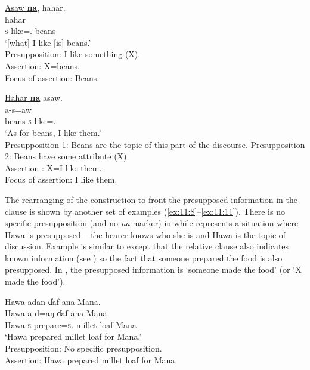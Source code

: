 \ea \label{ex:11:6}
\underline{Asaw  \textbf{na}},  hahar. \\
\gll  {}   hahar\\
      \textsc{s}-like={\oneS}.{\IO} {\PSP}  beans\\
\glt  ‘[what] I like [is] beans.’\\
  Presupposition:     I like something (X). \\
Assertion:     X=beans. \\
Focus of assertion:   Beans.
\z

\ea \label{ex:11:7}
\underline{Hahar  \textbf{na}}  asaw. \\
\gll  {}    a-s=aw\\
      beans  {\PSP} \textsc{s}-like={\oneS}.{\IO}\\
\glt  ‘As for beans, I like them.’ \\
  Presupposition 1:     Beans are the topic of this part of the discourse. 
  Presupposition 2:     Beans have some attribute (X).\\
Assertion :     X=I like them. \\
Focus of assertion:   I like them.
\z

The rearranging of the construction to front the presupposed information in the clause is shown by another set of examples (\ref{ex:11:8}--\ref{ex:11:11}). There is no specific presupposition (and no \textit{na} marker) in  while  represents a situation where Hawa is presupposed -- the hearer knows who she is and Hawa is the topic of discussion. Example  is similar to  except that the relative clause also indicates known information (see ) so the fact that someone prepared the food is also presupposed.  In , the presupposed information is ‘someone made the food’ (or ‘X made the food’). 

\clearpage
\ea \label{ex:11:8}
Hawa  adan  ɗaf  ana  Mana.\\
\gll  Hawa  a-d=aŋ      ɗaf  ana   Mana\\
      Hawa  \textsc{s}-prepare=\textsc{s}.{\IO}    {millet loaf}  {\DAT} Mana\\
\glt  ‘Hawa prepared millet loaf for Mana.’  \\
Presupposition:     No specific presupposition.\\
  Assertion:     Hawa prepared millet loaf for Mana.
\z

